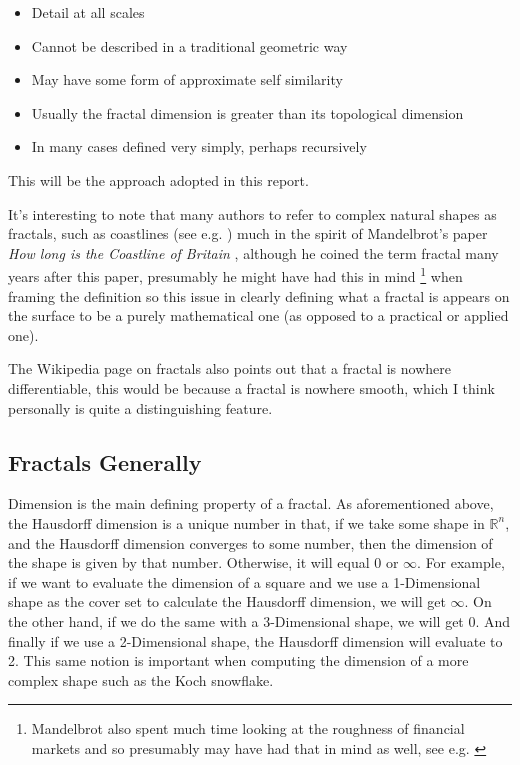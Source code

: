 \documentclass[11pt]{article}
\begin{document}
\begin{itemize}
\item Detail at all scales
\item Cannot be described in a traditional geometric way
\item May have some form of approximate self similarity
\item Usually the fractal dimension is greater than its topological dimension
\item In many cases defined very simply, perhaps recursively
\end{itemize}

This will be the approach adopted in this report.

It's interesting to note that many authors to refer to complex natural shapes as
fractals, such as coastlines (see e.g.
\cite{jiangFractalAnalysisComplexity1998,zhuFractalMechanismCoastline2002,zhongFractalPropertiesShoreline2017})
much in the spirit of Mandelbrot's paper \emph{How long is the Coastline of Britain}
\cite{mandelbrotHowLongCoast1967}, although he coined the term fractal many years
after this paper, presumably he might have had this in mind \footnote{Mandelbrot also
spent much time looking at the roughness of financial markets and so presumably
may have had that in mind as well, see e.g.
\cite{gomoryBenoitMandelbrot19242010,mandelbrotMisBehaviourMarkets2008}} when
framing the definition so this issue in clearly defining what a fractal is
appears on the surface to be a purely mathematical one (as opposed to a
practical or applied one).

The Wikipedia page on fractals \cite{Fractal2020} also points out that a
fractal is nowhere differentiable, this would be because a fractal is
nowhere smooth, which I think personally is quite a distinguishing feature.

\subsection{Fractals Generally}
\label{sec:orga61ebcf}
Dimension is the main defining property of a fractal. As aforementioned above, the Hausdorff dimension is a unique number in that, if we take some shape in \(\mathbb{R}^{n}\), and the Hausdorff dimension converges to some number, then the dimension of the shape is given by that number. Otherwise, it will equal \(0\) or \(\infty\). For example, if we want to evaluate the dimension of a square and we use a 1-Dimensional shape as the cover set to calculate the Hausdorff dimension, we will get \(\infty\). On the other hand, if we do the same with a 3-Dimensional shape, we will get 0. And finally if we use a 2-Dimensional shape, the Hausdorff dimension will evaluate to 2. This same notion is important when computing the dimension of a more complex shape such as the Koch snowflake.
\end{document}
